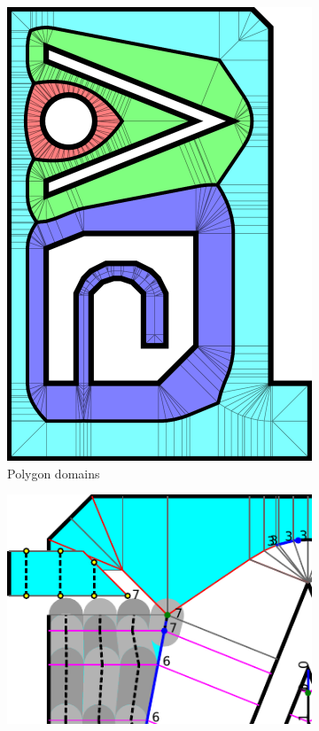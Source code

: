 \begin{figure}
\centering
\setlength{\figheight}{.3\columnwidth}
\begin{subfigure}{.3\columnwidth}\centering
\includegraphics[height=\figheight]{sources/method/domains.pdf}
\caption{Polygon domains}\label{shape_decomposition_domains}
\end{subfigure}
\begin{subfigure}{.6\columnwidth}\centering
\includegraphics[height=\figheight]{sources/method/segment_generation.pdf}

\end{subfigure}
\end{figure}

